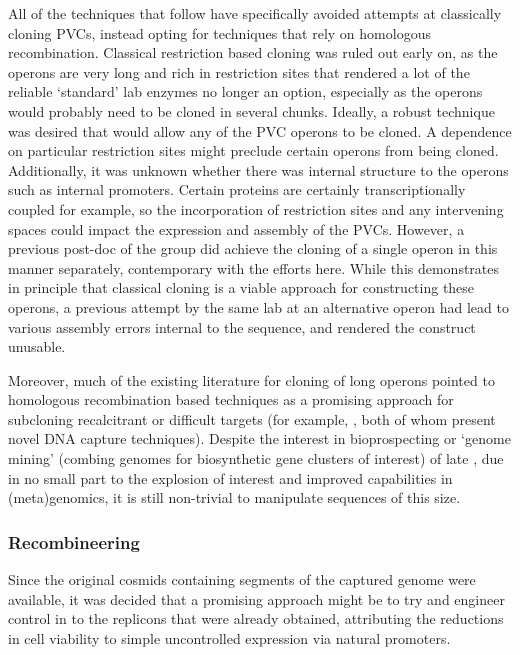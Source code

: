 All of the techniques that follow have specifically avoided attempts at classically cloning PVCs, instead opting for techniques that rely on homologous recombination. Classical restriction based cloning was ruled out early on, as the operons are very long and rich in restriction sites that rendered a lot of the reliable `standard' lab enzymes no longer an option, especially as the operons would probably need to be cloned in several chunks. Ideally, a robust technique was desired that would allow any of the PVC operons to be cloned. A dependence on particular restriction sites might preclude certain operons from being cloned. Additionally, it was unknown whether there was internal structure to the operons such as internal promoters. Certain proteins are certainly transcriptionally coupled for example, so the incorporation of restriction sites and any intervening spaces could impact the expression and assembly of the PVCs. However, a previous post-doc of the group did achieve the cloning of a single operon in this manner separately, contemporary with the efforts here. While this demonstrates in principle that classical cloning is a viable approach for constructing these operons, a previous attempt by the same lab at an alternative operon had lead to various assembly errors internal to the sequence, and rendered the construct unusable.

Moreover, much of the existing literature for cloning of long operons pointed to homologous recombination based techniques as a promising approach for subcloning recalcitrant or difficult targets (for example, \cite{Wang2016, Garcia2004}, both of whom present novel DNA capture techniques). Despite the interest in bioprospecting or `genome mining' (combing genomes for biosynthetic gene clusters of interest) of late \citep{Ziemert2016, VanLanen2006, Netta2009, Lautru2005, Bergmann2007, Wenzel2009, Charlop-Powers2014}, due in no small part to the explosion of interest and improved capabilities in (meta)genomics, it is still non-trivial to manipulate sequences of this size.

\subsubsection{Recombineering}\label{recombineering}
Since the original cosmids containing segments of the captured genome were available, it was decided that a promising approach might be to try and engineer control in to the replicons that were already obtained, attributing the reductions in cell viability to simple uncontrolled expression via natural promoters.

